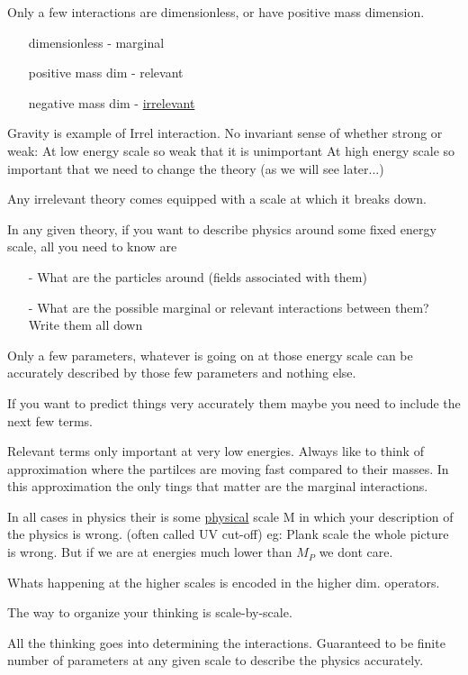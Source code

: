 {Only a few interactions are dimensionless, or have positive mass dimension. 

\begin{itemize}
\item[]dimensionless - marginal 
\item[]positive mass dim - relevant
\item[]negative mass dim - \underline{irrelevant}
\end{itemize}


Gravity is example of Irrel interaction.  
No invariant sense of whether strong or weak: 
At low energy scale so weak that it is unimportant
At high energy scale so important that we need to change the theory (as we will see later...)

Any irrelevant theory comes equipped with a scale at which it breaks down.

In any given theory, if you want to describe physics around some fixed energy scale, all you need to know are

\begin{itemize}
\item[-] What are the particles around (fields associated with them)
\item[-] What are the possible marginal or relevant interactions between them?  Write them all down
\end{itemize}

Only a few parameters, whatever is going on at those energy scale can be accurately described by those few parameters and nothing else.

If you want to predict things very accurately them maybe you need to include the next few terms. 

Relevant terms only important at very low energies. 
Always like to think of approximation where the partilces are moving fast compared to their masses. 
In this approximation the only tings that matter are the marginal interactions. 

In all cases in physics their is some \underline{physical} scale M in which your description of the physics is wrong.
(often called UV cut-off)  eg: Plank scale the whole picture is wrong. 
But if we are at energies much lower than $M_{P}$ we dont care.

Whats happening at the higher scales is encoded in the higher dim. operators.

The way to organize your thinking is scale-by-scale.

All the thinking goes into determining the interactions. 
Guaranteed to be finite number of parameters at any given scale to describe the physics accurately. 

}
